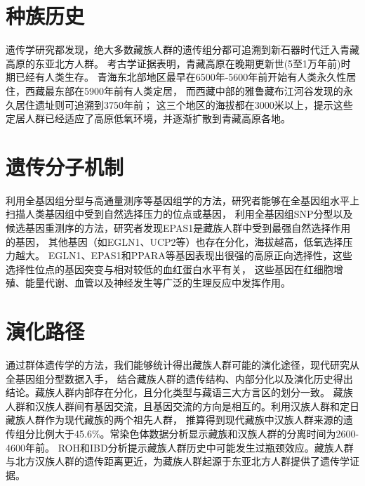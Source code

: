 \documentclass[UTF8]{article}
\begin{document}

    \section{种族历史}
    遗传学研究都发现，绝大多数藏族人群的遗传组分都可追溯到新石器时代迁入青藏高原的东亚北方人群。
    考古学证据表明，青藏高原在晚期更新世(5至1万年前)时期已经有人类生存。
    青海东北部地区最早在6500年-5600年前开始有人类永久性居住，西藏最东部在5900年前有人类定居，
    而西藏中部的雅鲁藏布江河谷发现的永久居住遗址则可追溯到3750年前；
    这三个地区的海拔都在3000米以上，提示这些定居人群已经适应了高原低氧环境，并逐渐扩散到青藏高原各地。

    \section{遗传分子机制}
    利用全基因组分型与高通量测序等基因组学的方法，研究者能够在全基因组水平上扫描人类基因组中受到自然选择压力的位点或基因，
    利用全基因组SNP分型以及候选基因重测序的方法，研究者发现EPAS1是藏族人群中受到最强自然选择作用的基因，
    其他基因（如EGLN1、UCP2等）也存在分化，海拔越高，低氧选择压力越大。
    EGLN1、EPAS1和PPARA等基因表现出很强的高原正向选择性，这些选择性位点的基因突变与相对较低的血红蛋白水平有关，
    这些基因在红细胞增殖、能量代谢、血管以及神经发生等广泛的生理反应中发挥作用。

    \section{演化路径}
    通过群体遗传学的方法，我们能够统计得出藏族人群可能的演化途径，现代研究从全基因组分型数据入手，
    结合藏族人群的遗传结构、内部分化以及演化历史得出结论。藏族人群内部存在分化，且分化类型与藏语三大方言区的划分一致。
    藏族人群和汉族人群间有基因交流，且基因交流的方向是相互的。利用汉族人群和定日藏族人群作为现代藏族的两个祖先人群，
    推算得到现代藏族中汉族人群来源的遗传组分比例大于45.6\%。常染色体数据分析显示藏族和汉族人群的分离时间为2600-4600年前。
    ROH和IBD分析提示藏族人群历史中可能发生过瓶颈效应。藏族人群与北方汉族人群的遗传距离更近，为藏族人群起源于东亚北方人群提供了遗传学证据。
\end{document}
